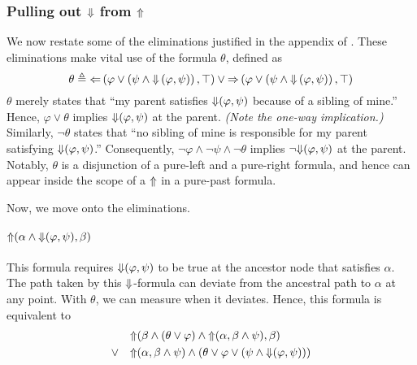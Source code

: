 \documentclass[a4paper,UKenglish,cleveref, autoref, thm-restate, numberwithinsect]{lipics-v2021}
\def\Larrow{\ensuremath\mathord{\Leftarrow}}
\def\Rarrow{\ensuremath\mathord{\Rightarrow}}
\def\Uarrow{\ensuremath\mathord{\Uparrow}}
\def\Darrow{\ensuremath\mathord{\Downarrow}}
\begin{document}
\subsubsection{Pulling out $\Darrow$ from $\Uarrow$}
\label{sec:eliminations-trees}

We now restate some of the eliminations justified in the appendix of \cite{xpathComplete}. These eliminations make vital use of the formula $\theta$, defined as
\begin{equation}
    \label{eq:theta-defn}
    \theta \triangleq \Larrow\left(\varphi \lor \left( \psi \land \Darrow\left( \varphi, \psi \right) \right), \top \right) \lor \Rarrow \left( \varphi \lor \left( \psi \land \Darrow \left( \varphi, \psi \right) \right), \top \right)
\end{equation}
$\theta$ merely states that ``my parent satisfies $\Darrow(\varphi, \psi)$ because of a sibling of mine.'' Hence, $\varphi \lor \theta$ implies $\Darrow(\varphi, \psi)$ at the parent. \textit{(Note the one-way implication.)} Similarly, $\lnot \theta$ states that ``no sibling of mine is responsible for my parent satisfying $\Darrow(\varphi, \psi)$.'' Consequently, $\lnot \varphi \land \lnot \psi \land \lnot \theta$ implies $\lnot \Darrow(\varphi, \psi)$ at the parent. Notably, $\theta$ is a disjunction of a pure-left and a pure-right formula, and hence can appear inside the scope of a $\Uarrow$ in a pure-past formula.

Now, we move onto the eliminations.

\paragraph*{$\Uarrow(\alpha \land \Darrow(\varphi, \psi), \beta)$}

This formula requires $\Darrow(\varphi, \psi)$ to be true at the ancestor node that satisfies $\alpha$. The path taken by this $\Darrow$-formula can deviate from the ancestral path to $\alpha$ at any point. With $\theta$, we can measure when it deviates. Hence, this formula is equivalent to
\begin{equation*}
    \begin{aligned}
        &\Uarrow(\beta \land (\theta \lor \varphi) \land \Uarrow(\alpha, \beta \land \psi), \beta) \\
        \lor \quad &\Uarrow(\alpha, \beta \land \psi) \land \left( \theta \lor \varphi \lor \left( \psi \land \Darrow(\varphi, \psi) \right) \right) \\
    \end{aligned}
\end{equation*}
\end{document}
